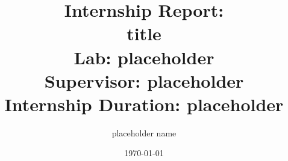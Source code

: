 \titleformat{\section}{\normalfont\Large\bfseries}{\thesection}{1em}{}
\title{
    \vspace{3cm} 
    \large Internship Report: \\
    \vspace{0.5cm} 
    \textbf{\Huge title} \\
    \vspace{1cm} 
    \large Lab: placeholder \\
    \vspace{0.5cm} 
    \large Supervisor: placeholder \\
    \vspace{0.5cm} 
    \large Internship Duration: placeholder}

\author{placeholder name}
\date{\today}
\maketitle
\thispagestyle{empty}